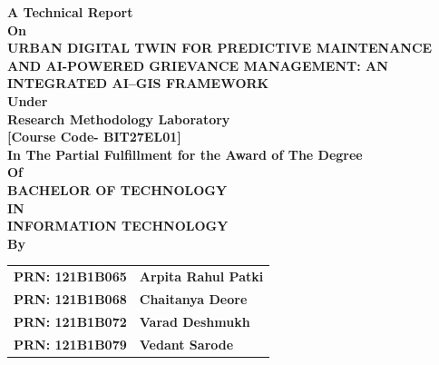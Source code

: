 \documentclass[12pt,a4paper]{report}
\begin{document}
\begin{titlepage}
\thispagestyle{empty}
\begin{center}
    {\fontsize{14pt}{18pt}\selectfont \textbf{A Technical Report}}\\[0.3cm]
    {\fontsize{12pt}{15pt}\selectfont \textbf{On}}\\[0.6cm]

    {\fontsize{16pt}{22pt}\selectfont \textbf{URBAN DIGITAL TWIN FOR PREDICTIVE MAINTENANCE AND AI-POWERED GRIEVANCE MANAGEMENT: AN INTEGRATED AI--GIS FRAMEWORK}}\\[0.8cm]

    {\fontsize{12pt}{15pt}\selectfont \textbf{Under}}\\[0.3cm]
    {\fontsize{14pt}{18pt}\selectfont \textbf{Research Methodology Laboratory}}\\[0.2cm]
    {\fontsize{12pt}{15pt}\selectfont \textbf{[Course Code- BIT27EL01]}}\\[0.8cm]

    {\fontsize{12pt}{15pt}\selectfont \textbf{In The Partial Fulfillment for the Award of The Degree}}\\[0.2cm]
    {\fontsize{12pt}{15pt}\selectfont \textbf{Of}}\\[0.2cm]
    {\fontsize{14pt}{18pt}\selectfont \textbf{BACHELOR OF TECHNOLOGY}}\\[0.2cm]
    {\fontsize{12pt}{15pt}\selectfont \textbf{IN}}\\[0.2cm]
    {\fontsize{14pt}{18pt}\selectfont \textbf{INFORMATION TECHNOLOGY}}\\[0.8cm]

    {\fontsize{12pt}{15pt}\selectfont \textbf{By}}\\[0.3cm]
    \begin{table}[h]
    \centering
    \fontsize{11pt}{14pt}\selectfont
    \begin{tabular}{ll}
        \textbf{PRN: 121B1B065} & \textbf{Arpita Rahul Patki} \\
        \textbf{PRN: 121B1B068} & \textbf{Chaitanya Deore} \\
        \textbf{PRN: 121B1B072} & \textbf{Varad Deshmukh} \\
        \textbf{PRN: 121B1B079} & \textbf{Vedant Sarode}
    \end{tabular}
    \end{table}


\end{center}
\end{titlepage}
\end{document}
